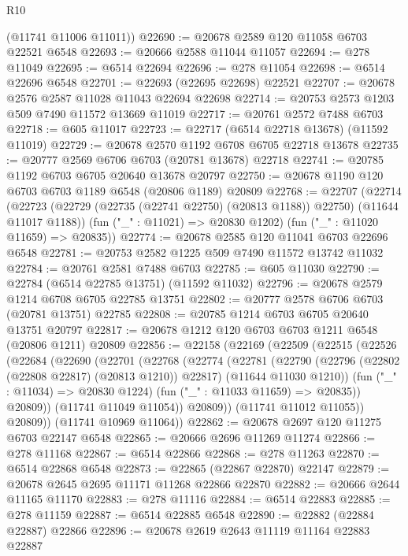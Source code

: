 \begin{lexlean}{R10}
\begin{coremodule}
      (@11741 @11006 @11011))
@22690 := @20678 @2589 @120 @11058 @6703 @22521 @6548
@22693 := @20666 @2588 @11044 @11057
@22694 := @278 @11049
@22695 := @6514 @22694
@22696 := @278 @11054
@22698 := @6514 @22696 @6548
@22701 := @22693 (@22695 @22698) @22521
@22707 := @20678 @2576 @2587 @11028 @11043 @22694 @22698
@22714 := @20753 @2573 @1203 @509 @7490 @11572 @13669 @11019
@22717 := @20761 @2572 @7488 @6703
@22718 := @605 @11017
@22723 := @22717 (@6514 @22718 @13678) (@11592 @11019)
@22729 := @20678 @2570 @1192 @6708 @6705 @22718 @13678
@22735 := @20777 @2569 @6706 @6703 (@20781 @13678) @22718
@22741 := @20785 @1192 @6703 @6705 @20640 @13678 @20797
@22750 := @20678 @1190 @120 @6703 @6703 @1189 @6548 (@20806 @1189) @20809
@22768 := @22707
    (@22714
      (@22723 (@22729 (@22735 (@22741 @22750) (@20813 @1188)) @22750) (@11644 @11017 @1188))
      (fun ("_" : @11021) => @20830 @1202)
      (fun ("_" : @11020 @11659) => @20835))
@22774 := @20678 @2585 @120 @11041 @6703 @22696 @6548
@22781 := @20753 @2582 @1225 @509 @7490 @11572 @13742 @11032
@22784 := @20761 @2581 @7488 @6703
@22785 := @605 @11030
@22790 := @22784 (@6514 @22785 @13751) (@11592 @11032)
@22796 := @20678 @2579 @1214 @6708 @6705 @22785 @13751
@22802 := @20777 @2578 @6706 @6703 (@20781 @13751) @22785
@22808 := @20785 @1214 @6703 @6705 @20640 @13751 @20797
@22817 := @20678 @1212 @120 @6703 @6703 @1211 @6548 (@20806 @1211) @20809
@22856 := @22158
    (@22169
      (@22509
        (@22515
          (@22526
            (@22684
              (@22690
                (@22701
                  (@22768
                    (@22774
                      (@22781
                        (@22790
                          (@22796 (@22802 (@22808 @22817) (@20813 @1210)) @22817)
                          (@11644 @11030 @1210))
                        (fun ("_" : @11034) => @20830 @1224)
                        (fun ("_" : @11033 @11659) => @20835))
                      @20809))
                  (@11741 @11049 @11054))
                @20809))
            (@11741 @11012 @11055))
          @20809))
      (@11741 @10969 @11064))
@22862 := @20678 @2697 @120 @11275 @6703 @22147 @6548
@22865 := @20666 @2696 @11269 @11274
@22866 := @278 @11168
@22867 := @6514 @22866
@22868 := @278 @11263
@22870 := @6514 @22868 @6548
@22873 := @22865 (@22867 @22870) @22147
@22879 := @20678 @2645 @2695 @11171 @11268 @22866 @22870
@22882 := @20666 @2644 @11165 @11170
@22883 := @278 @11116
@22884 := @6514 @22883
@22885 := @278 @11159
@22887 := @6514 @22885 @6548
@22890 := @22882 (@22884 @22887) @22866
@22896 := @20678 @2619 @2643 @11119 @11164 @22883 @22887

\end{coremodule}
\end{lexlean}
